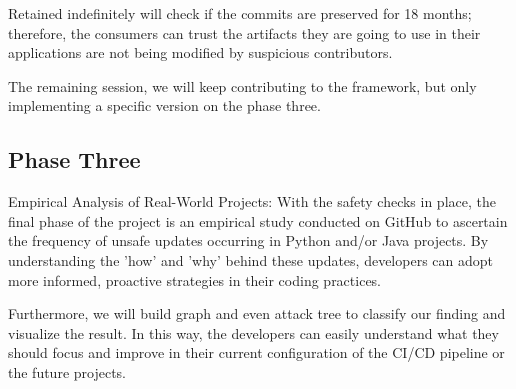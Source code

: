 Retained indefinitely will check if the commits are preserved for 18 months; therefore, the
consumers can trust the artifacts they are going to use in their applications are not being 
modified by suspicious contributors.

The remaining session, we will keep contributing to the framework, but only implementing a
specific version on the phase three.
\subsection{Phase Three}
Empirical Analysis of Real-World Projects: With the safety checks in place, 
the final phase of the project is an empirical study conducted on GitHub to ascertain
the frequency of unsafe updates occurring in Python and/or Java projects.
By understanding the 'how' and 'why' behind these updates, developers can adopt more 
informed, proactive strategies in their coding practices.

Furthermore, we will build graph and even attack tree to classify our finding and visualize 
the result. In this way, the developers can easily understand what they should focus 
and improve in their current configuration of the CI/CD pipeline or the future projects.





